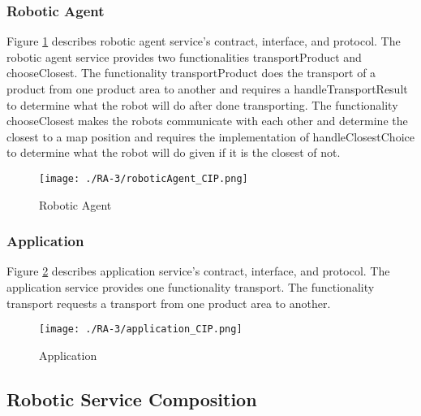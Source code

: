 \subsubsection{Robotic Agent} %
Figure \ref{fig:roboticagent_cip} describes robotic agent service's contract, interface, and protocol. The robotic agent service provides two functionalities transportProduct and chooseClosest. The functionality transportProduct does the transport of a product from one product area to another and requires a handleTransportResult to determine what the robot will do after done transporting. The functionality chooseClosest makes the robots communicate with each other and determine the closest to a map position and requires the implementation of handleClosestChoice to determine what the robot will do given if it is the closest of not. 
\begin{figure}[ht!]
 \centering
 \texttt{[image: ./RA-3/roboticAgent\_CIP.png]}
 \caption{Robotic Agent}
 \label{fig:roboticagent_cip}
\end{figure}

\subsubsection{Application} %
Figure \ref{fig:application_cip} describes application service's contract, interface, and protocol. The application service provides one functionality transport. The functionality transport requests a transport from one product area to another. 
\begin{figure}[ht!]
 \centering
 \texttt{[image: ./RA-3/application\_CIP.png]}
 \caption{Application}
 \label{fig:application_cip}
\end{figure}

\subsection{Robotic Service Composition}
